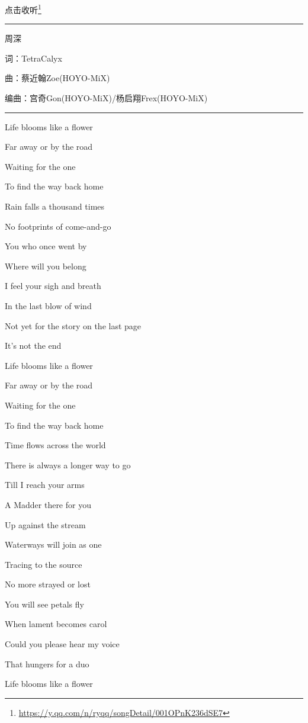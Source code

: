 \documentclass[]{ctexbook}
\renewcommand{\href}[2]{#2\footnote{\url{#1}}}
\begin{document}
\href{https://y.qq.com/n/ryqq/songDetail/001OPnK236dSE7}{点击收听}

\begin{center}\rule{0.5\linewidth}{0.5pt}\end{center}

周深

词：TetraCalyx

曲：蔡近翰Zoe(HOYO-MiX)

编曲：宫奇Gon(HOYO-MiX)/杨启翔Frex(HOYO-MiX)

\begin{center}\rule{0.5\linewidth}{0.5pt}\end{center}

Life blooms like a flower

Far away or by the road

Waiting for the one

To find the way back home

Rain falls a thousand times

No footprints of come-and-go

You who once went by

Where will you belong

I feel your sigh and breath

In the last blow of wind

Not yet for the story on the last page

It's not the end

Life blooms like a flower

Far away or by the road

Waiting for the one

To find the way back home

Time flows across the world

There is always a longer way to go

Till I reach your arms

A Madder there for you

Up against the stream

Waterways will join as one

Tracing to the source

No more strayed or lost

You will see petals fly

When lament becomes carol

Could you please hear my voice

That hungers for a duo

Life blooms like a flower
\end{document}
